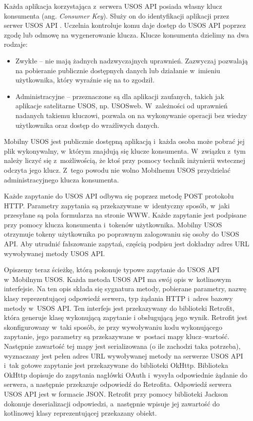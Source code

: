 \documentclass{pracamgr}
\begin{document}
Każda aplikacja korzystająca z~serwera USOS API posiada własny klucz konsumenta
(ang. \textit{Consumer Key}). Służy on do identyfikacji aplikacji przez serwer
USOS API \cite{usosapi-auth}. Uczelnia kontroluje komu daje dostęp do USOS API
poprzez zgodę lub odmowę na wygenerowanie klucza. Klucze konsumenta dzielimy na
dwa rodzaje:
\begin{itemize}
	\item Zwykłe -- nie mają żadnych nadzwyczajnych uprawnień. Zazwyczaj
	pozwalają na pobieranie publicznie dostępnych danych lub działanie w~imieniu
	użytkownika, który wyraźnie się na to zgodził.
	\item Administracyjne -- przeznaczone są dla aplikacji zaufanych, takich jak
	aplikacje satelitarne USOS, np. USOSweb. W~zależności od uprawnień nadanych
	takiemu kluczowi, pozwala on na wykonywanie operacji bez wiedzy użytkownika
	oraz dostęp do wrażliwych danych.
\end{itemize}
Mobilny USOS jest publicznie dostępną aplikacją i~każda osoba może pobrać jej
plik wykonywalny, w~którym znajdują się klucze konsumenta. W~związku z~tym należy
liczyć się z~możliwością, że ktoś przy pomocy technik inżynierii wstecznej odczyta
jego klucz. Z~tego powodu nie wolno Mobilnemu USOS przydzielać administracyjnego
klucza konsumenta.

Każde zapytanie do USOS API odbywa się poprzez metodę POST protokołu HTTP.
Parametry zapytania są przekazywane w~identyczny sposób, w~jaki przesyłane są
pola formularza na stronie WWW. Każde zapytanie jest podpisane przy pomocy klucza
konsumenta i~tokenów użytkownika. Mobilny USOS otrzymuje tokeny użytkownika po
poprawnym zalogowaniu się osoby do USOS API. Aby utrudnić fałszowanie zapytań,
częścią podpisu jest dokładny adres URL wywoływanej metody USOS API.

Opiszemy teraz ścieżkę, którą pokonuje typowe zapytanie do USOS API w~Mobilnym USOS.
Każda metoda USOS API ma swój opis w~kotlinowym interfejsie. Na ten opis składa
się sygnatura metody, pobierane parametry, nazwę klasy reprezentującej odpowiedź
serwera, typ żądania HTTP i~adres bazowy metody w~USOS API. Ten interfejs jest
przekazywany do biblioteki Retrofit, która generuje klasę wykonującą zapytanie i
obsługującą jego wynik. Retrofit jest skonfigurowany w~taki sposób, że przy
wywoływaniu kodu wykonującego zapytanie, jego parametry są przekazywane w~postaci
mapy klucz--wartość. Następnie zawartość tej mapy jest serializowana (o ile zachodzi
taka potrzeba), wyznaczany jest pełen adres URL wywoływanej metody na serwerze USOS
API i~tak gotowe zapytanie jest przekazywane do biblioteki OkHttp. Biblioteka
OkHttp dopisuje do zapytania nagłówki OAuth i~wysyła odpowiednie żądanie do serwera,
a następnie przekazuje odpowiedź do Retrofita. Odpowiedź serwera USOS API jest w
formacie JSON. Retrofit przy pomocy biblioteki Jackson dokonuje deserializacji
odpowiedzi, a~następnie wpisuje jej zawartość do kotlinowej klasy reprezentującej
przekazany obiekt.
\end{document}
